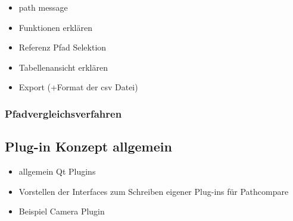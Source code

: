 \begin{itemize}
  \item path message
  \item Funktionen erklären
  \item Referenz Pfad Selektion
  \item Tabellenansicht erklären
  \item Export (+Format der csv Datei)
\end{itemize}

\subsubsection{Pfadvergleichsverfahren}



\subsection{Plug-in Konzept allgemein}
\begin{itemize}
  \item allgemein Qt Plugins
  \item Vorstellen der Interfaces zum Schreiben eigener Plug-ins für Pathcompare
  \item Beispiel Camera Plugin
\end{itemize}
